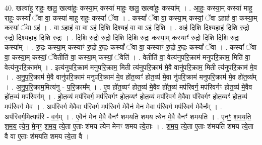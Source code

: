 \documentclass[17pt]{extarticle}
\begin{document}
40. खल्वा॑हु राहुः॒ खलु॒ खल्वा॑हुः॒ कस्या॒म् कस्या॑ माहुः॒ खलु॒ खल्वा॑हुः॒ कस्या᳚म् । . आ॒हुः॒ कस्या॒म् कस्या॑ माहु राहुः॒ कस्यां᳚ ॅवा वा॒ कस्या॑ माहु राहुः॒ कस्यां᳚ ॅवा । . कस्यां᳚ ॅवा वा॒ कस्या॒म् कस्यां॒ ॅवा ऽहाह॑ वा॒ कस्या॒म् कस्यां॒ ॅवा ऽह॑ । . वा ऽहाह॑ वा॒ वा ऽह॑ दि॒शि दि॒श्यह॑ वा॒ वा ऽह॑ दि॒शि । . अह॑ दि॒शि दि॒श्यहाह॑ दि॒शि रु॒द्रो रु॒द्रो दि॒श्यहाह॑ दि॒शि रु॒द्रः । . दि॒शि रु॒द्रो रु॒द्रो दि॒शि दि॒शि रु॒द्रः कस्या॒म् कस्याꣳ॑ रु॒द्रो दि॒शि दि॒शि रु॒द्रः कस्या᳚म् । . रु॒द्रः कस्या॒म् कस्याꣳ॑ रु॒द्रो रु॒द्रः कस्यां᳚ ॅवा वा॒ कस्याꣳ॑ रु॒द्रो रु॒द्रः कस्यां᳚ ॅवा । . कस्यां᳚ ॅवा वा॒ कस्या॒म् कस्यां॒ ॅवेतीति॑ वा॒ कस्या॒म् कस्यां॒ ॅवेति॑ । . वेतीति॑ वा॒ वेत्य॑नुपरि॒क्राम॑ मनुपरि॒क्राम॒ मिति॑ वा॒ वेत्य॑नुपरि॒क्राम᳚म् । . इत्य॑नुपरि॒क्राम॑ मनुपरि॒क्राम॒ मिती त्य॑नुपरि॒क्राम॑ मे॒वै वानु॑परि॒क्राम॒ मिती त्य॑नुपरि॒क्राम॑ मे॒व । . अ॒नु॒प॒रि॒क्राम॑ मे॒वै वानु॑परि॒क्राम॑ मनुपरि॒क्राम॑ मे॒व हो॑त॒व्यꣳ॑ होत॒व्य॑ मे॒वा नु॑परि॒क्राम॑ मनुपरि॒क्राम॑ मे॒व हो॑त॒व्य᳚म् । . अ॒नु॒प॒रि॒क्राम॒मित्य॑नु - प॒रि॒क्राम᳚म् । . ए॒व हो॑त॒व्यꣳ॑ होत॒व्य॑ मे॒वैव हो॑त॒व्य॑ मप॑रिवर्ग॒ मप॑रिवर्गꣳ होत॒व्य॑ मे॒वैव हो॑त॒व्य॑ मप॑रिवर्गम् । . हो॒त॒व्य॑ मप॑रिवर्ग॒ मप॑रिवर्गꣳ होत॒व्यꣳ॑ होत॒व्य॑ मप॑रिवर्ग मे॒वैवा प॑रिवर्गꣳ होत॒व्यꣳ॑ होत॒व्य॑ मप॑रिवर्ग मे॒व । . अप॑रिवर्ग मे॒वैवा प॑रिवर्ग॒ मप॑रिवर्ग मे॒वैन॑ मेन मे॒वा प॑रिवर्ग॒ मप॑रिवर्ग मे॒वैन᳚म् । . अप॑रिवर्ग॒मित्यप॑रि - व॒र्ग॒म् । . ए॒वैन॑ मेन मे॒वै वैनꣳ॑ शमयति शमय त्येन मे॒वै वैनꣳ॑ शमयति । . ए॒नꣳ॒॒ श॒म॒य॒ति॒ श॒म॒य॒ त्ये॒न॒ मे॒नꣳ॒॒ श॒म॒य॒ त्ये॒ता ए॒ताः श॑मय त्येन मेनꣳ शमय त्ये॒ताः । . श॒म॒य॒ त्ये॒ता ए॒ताः श॑मयति शमय त्ये॒ता वै वा ए॒ताः श॑मयति शमय त्ये॒ता वै । \newline
\pagebreak
{}
\end{document}
